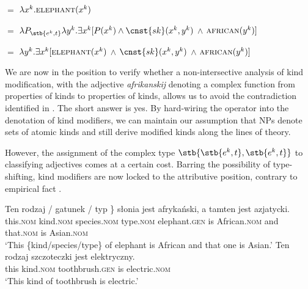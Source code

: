 \documentclass[output=paper,
colorlinks,
citecolor=brown,
newtxmath
]{langscibook}
\begin{document}
\ea \label{ex:final_deriv}
\ea {} $=$ $\lambda x^k.\textsc{elephant}(x^k)$ \label{ex:final_deriv_1}

\ex {} $=$ $\lambda P_{\stb{e^k, t}}\lambda y^k. \exists x^k [P(x^k) \wedge \cnst{sk}(x^k, y^k)$ $\wedge$ $\textsc{african}(y^k)]$ \label{ex:final_deriv_2}

\ex {} $=$ $\lambda y^k. \exists x^k [\textsc{elephant}(x^k)$ $\wedge$ $\cnst{sk}(x^k, y^k)$ $\wedge$ $ \textsc{african}(y^k)]$
\label{ex:final_deriv_3}
\z \z

\noindent
We are now in the position to verify whether a non-intersective analysis of kind modification, with the adjective \textit{afrikanskij} denoting a complex function from properties of kinds to properties of kinds, allows us to avoid the contradiction identified in . The short answer is yes. By hard-wiring the  operator into the denotation of kind modifiers, we can maintain our assumption that NPs denote sets of atomic kinds and still derive modified kinds along the lines of  theory.
\largerpage %

\sloppy However, the assignment of the complex type $\stb{\stb{e^k,t}, \stb{e^k,t}}$ to classifying adjectives comes at a certain cost.
Barring the possibility of type-shifting, kind modifiers are now locked to the attributive position, contrary to empirical fact .

\ea \label{ex:predicative_modifier}
\ea \gll
Ten \minsp{\{} rodzaj / gatunek / typ \} słonia jest afrykański, a tamten jest azjatycki.\\
this.\textsc{nom} {} kind.\textsc{nom} { } species.\textsc{nom} { } type.\textsc{nom} { } elephant.\textsc{gen} is African.\textsc{nom} and that.\textsc{nom} is Asian.\textsc{nom}\\
\glt `This \{kind/species/type\} of elephant is African and that one is Asian.'
\ex \gll
Ten rodzaj szczoteczki jest elektryczny.\\
this kind.\textsc{nom} toothbrush.\textsc{gen} is electric.\textsc{nom}\\
\glt `This kind of toothbrush is electric.'
\z \z
\end{document}
